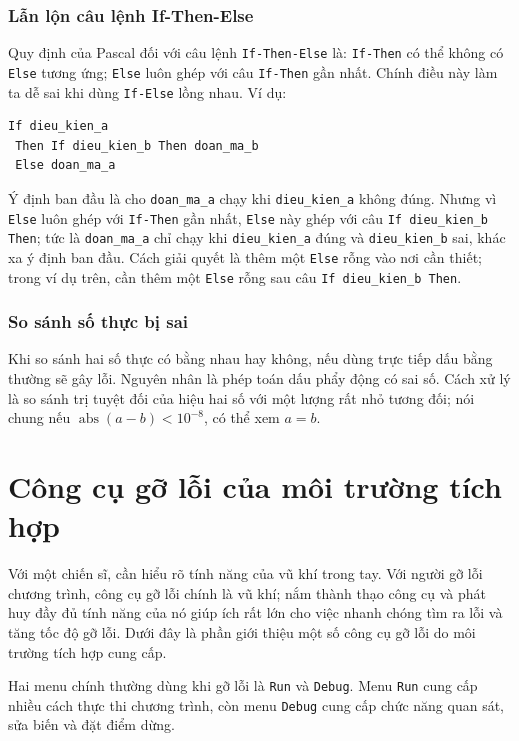 \documentclass[11pt]{article}
\begin{document}
\subsubsection{Lẫn lộn câu lệnh If-Then-Else}

Quy định của Pascal đối với câu lệnh \texttt{If-Then-Else} là:
\texttt{If-Then} có thể không có \texttt{Else} tương ứng; \texttt{Else} luôn
ghép với câu \texttt{If-Then} gần nhất. Chính điều này làm ta dễ sai khi dùng
\texttt{If-Else} lồng nhau. Ví dụ:
\begin{verbatim}
If dieu_kien_a
 Then If dieu_kien_b Then doan_ma_b
 Else doan_ma_a
\end{verbatim}
Ý định ban đầu là cho \texttt{doan\_ma\_a} chạy khi
\texttt{dieu\_kien\_a} không đúng. Nhưng vì \texttt{Else} luôn ghép với
\texttt{If-Then} gần nhất, \texttt{Else} này ghép với câu
\texttt{If dieu\_kien\_b Then}; tức là \texttt{doan\_ma\_a} chỉ chạy khi
\texttt{dieu\_kien\_a} đúng và \texttt{dieu\_kien\_b} sai, khác xa ý định
ban đầu. Cách giải quyết là thêm một \texttt{Else} rỗng vào nơi cần thiết;
trong ví dụ trên, cần thêm một \texttt{Else} rỗng sau câu
\texttt{If dieu\_kien\_b Then}.

\subsubsection{So sánh số thực bị sai}

Khi so sánh hai số thực có bằng nhau hay không, nếu dùng trực tiếp dấu bằng
thường sẽ gây lỗi. Nguyên nhân là phép toán dấu phẩy động có sai số. Cách xử
lý là so sánh trị tuyệt đối của hiệu hai số với một lượng rất nhỏ tương đối;
nói chung nếu \(\operatorname{abs}(a-b)<10^{-8}\), có thể xem \(a=b\).

\section{Công cụ gỡ lỗi của môi trường tích hợp}

Với một chiến sĩ, cần hiểu rõ tính năng của vũ khí trong tay. Với người gỡ lỗi
chương trình, công cụ gỡ lỗi chính là vũ khí; nắm thành thạo công cụ và phát
huy đầy đủ tính năng của nó giúp ích rất lớn cho việc nhanh chóng tìm ra lỗi
và tăng tốc độ gỡ lỗi. Dưới đây là phần giới thiệu một số công cụ gỡ lỗi do
môi trường tích hợp cung cấp.

Hai menu chính thường dùng khi gỡ lỗi là \texttt{Run} và \texttt{Debug}. Menu
\texttt{Run} cung cấp nhiều cách thực thi chương trình, còn menu
\texttt{Debug} cung cấp chức năng quan sát, sửa biến và đặt điểm dừng.
\end{document}
